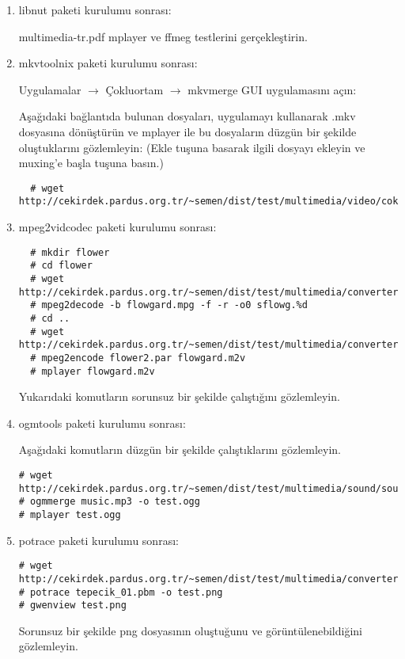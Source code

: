 \documentclass[a4paper,10pt]{article}
\begin{document}
\begin{enumerate}
\item libnut paketi kurulumu sonrası:

multimedia-tr.pdf mplayer ve ffmeg testlerini gerçekleştirin.

\item mkvtoolnix paketi kurulumu sonrası:

Uygulamalar $\rightarrow$ Çokluortam $\rightarrow$ mkvmerge GUI uygulamasını açın:

Aşağıdaki bağlantıda bulunan dosyaları, uygulamayı kullanarak .mkv dosyasına dönüştürün ve mplayer ile bu dosyaların düzgün bir şekilde oluştuklarını gözlemleyin: (Ekle tuşuna basarak ilgili dosyayı ekleyin ve muxing'e başla tuşuna basın.)
\begin{verbatim}
  # wget http://cekirdek.pardus.org.tr/~semen/dist/test/multimedia/video/cokluortam.tar
 \end{verbatim}

\item mpeg2vidcodec paketi kurulumu sonrası:
\begin{verbatim}
  # mkdir flower
  # cd flower
  # wget http://cekirdek.pardus.org.tr/~semen/dist/test/multimedia/converter/flowgard.mpg
  # mpeg2decode -b flowgard.mpg -f -r -o0 sflowg.%d
  # cd ..
  # wget http://cekirdek.pardus.org.tr/~semen/dist/test/multimedia/converter/flower2.par
  # mpeg2encode flower2.par flowgard.m2v
  # mplayer flowgard.m2v
\end{verbatim}

Yukarıdaki komutların sorunsuz bir şekilde çalıştığını gözlemleyin.
\item ogmtools paketi kurulumu sonrası:

Aşağıdaki komutların düzgün bir şekilde çalıştıklarını gözlemleyin.
\begin{verbatim}
# wget http://cekirdek.pardus.org.tr/~semen/dist/test/multimedia/sound/sound/music.mp3 
# ogmmerge music.mp3 -o test.ogg
# mplayer test.ogg
\end{verbatim}

\item potrace paketi kurulumu sonrası:
\begin{verbatim}
# wget http://cekirdek.pardus.org.tr/~semen/dist/test/multimedia/converter/tepecik_01.pbm 
# potrace tepecik_01.pbm -o test.png
# gwenview test.png
\end{verbatim}

Sorunsuz bir şekilde png dosyasının oluştuğunu ve görüntülenebildiğini gözlemleyin.


\end{enumerate}
\end{document}
